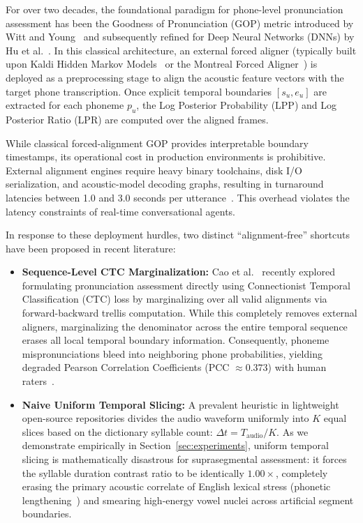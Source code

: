 \documentclass[10pt,conference]{IEEEtran}
\begin{document}
For over two decades, the foundational paradigm for phone-level pronunciation assessment has been the Goodness of Pronunciation (GOP) metric introduced by Witt and Young~\cite{witt2000phone} and subsequently refined for Deep Neural Networks (DNNs) by Hu et al.~\cite{hu2015improved}. In this classical architecture, an external forced aligner (typically built upon Kaldi Hidden Markov Models~\cite{povey2011kaldi} or the Montreal Forced Aligner~\cite{mcauliffe2017montreal}) is deployed as a preprocessing stage to align the acoustic feature vectors with the target phone transcription. Once explicit temporal boundaries $[s_u, e_u]$ are extracted for each phoneme $p_u$, the Log Posterior Probability (LPP) and Log Posterior Ratio (LPR) are computed over the aligned frames.

While classical forced-alignment GOP provides interpretable boundary timestamps, its operational cost in production environments is prohibitive. External alignment engines require heavy binary toolchains, disk I/O serialization, and acoustic-model decoding graphs, resulting in turnaround latencies between 1.0 and 3.0 seconds per utterance~\cite{mcauliffe2017montreal}. This overhead violates the latency constraints of real-time conversational agents.

In response to these deployment hurdles, two distinct ``alignment-free'' shortcuts have been proposed in recent literature:
\begin{itemize}
    \item \textbf{Sequence-Level CTC Marginalization:} Cao et al.~\cite{cao2024framework} recently explored formulating pronunciation assessment directly using Connectionist Temporal Classification (CTC) loss by marginalizing over all valid alignments via forward-backward trellis computation. While this completely removes external aligners, marginalizing the denominator across the entire temporal sequence erases all local temporal boundary information. Consequently, phoneme mispronunciations bleed into neighboring phone probabilities, yielding degraded Pearson Correlation Coefficients (PCC $\approx 0.373$) with human raters~\cite{cao2024framework}.
    \item \textbf{Naive Uniform Temporal Slicing:} A prevalent heuristic in lightweight open-source repositories divides the audio waveform uniformly into $K$ equal slices based on the dictionary syllable count: $\Delta t = T_{\text{audio}} / K$. As we demonstrate empirically in Section~\ref{sec:experiments}, uniform temporal slicing is mathematically disastrous for suprasegmental assessment: it forces the syllable duration contrast ratio to be identically $1.00\times$, completely erasing the primary acoustic correlate of English lexical stress (phonetic lengthening~\cite{fry1958experiments}) and smearing high-energy vowel nuclei across artificial segment boundaries.
\end{itemize}
\end{document}
